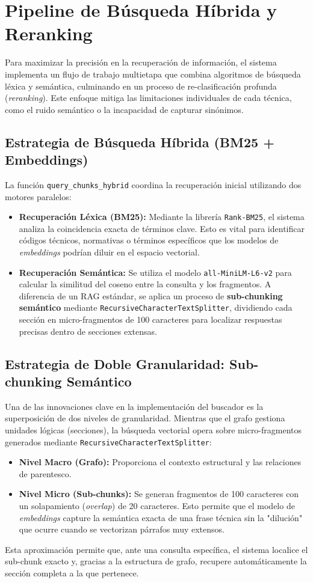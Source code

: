 \newpage
\section{Pipeline de Búsqueda Híbrida y Reranking}

Para maximizar la precisión en la recuperación de información, el sistema implementa un flujo de trabajo multietapa que combina algoritmos de búsqueda léxica y semántica, culminando en un proceso de re-clasificación profunda (\textit{reranking}). Este enfoque mitiga las limitaciones individuales de cada técnica, como el ruido semántico o la incapacidad de capturar sinónimos.

\subsection{Estrategia de Búsqueda Híbrida (BM25 + Embeddings)}
La función \texttt{query\_chunks\_hybrid} coordina la recuperación inicial utilizando dos motores paralelos:
\begin{itemize}
    \item \textbf{Recuperación Léxica (BM25):} Mediante la librería \texttt{Rank-BM25}, el sistema analiza la coincidencia exacta de términos clave. Esto es vital para identificar códigos técnicos, normativas o términos específicos que los modelos de \textit{embeddings} podrían diluir en el espacio vectorial.
    \item \textbf{Recuperación Semántica:} Se utiliza el modelo \texttt{all-\allowbreak MiniLM-\allowbreak L6-v2} para calcular la similitud del coseno entre la consulta y los fragmentos. A diferencia de un RAG estándar, se aplica un proceso de \textbf{sub-chunking semántico} mediante \texttt{RecursiveCharacterTextSplitter}, dividiendo cada sección en micro-fragmentos de 100 caracteres para localizar respuestas precisas dentro de secciones extensas.
\end{itemize}

\subsection{Estrategia de Doble Granularidad: Sub-chunking Semántico}
Una de las innovaciones clave en la implementación del buscador es la superposición de dos niveles de granularidad. Mientras que el grafo gestiona unidades lógicas (secciones), la búsqueda vectorial opera sobre micro-fragmentos generados mediante \texttt{RecursiveCharacterTextSplitter}:
\begin{itemize}
    \item \textbf{Nivel Macro (Grafo):} Proporciona el contexto estructural y las relaciones de parentesco.
    \item \textbf{Nivel Micro (Sub-chunks):} Se generan fragmentos de 100 caracteres con un solapamiento (\textit{overlap}) de 20 caracteres. Esto permite que el modelo de \textit{embeddings} capture la semántica exacta de una frase técnica sin la "dilución" que ocurre cuando se vectorizan párrafos muy extensos.
\end{itemize}
Esta aproximación permite que, ante una consulta específica, el sistema localice el sub-chunk exacto y, gracias a la estructura de grafo, recupere automáticamente la sección completa a la que pertenece.

